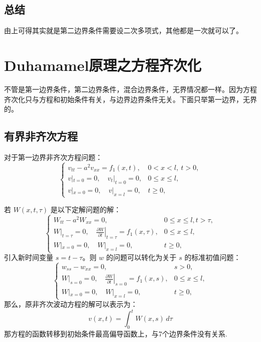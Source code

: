 \documentclass[a4paper, 12pt, oneside]{article} %
\numberwithin{subsection}{section}
\numberwithin{subsubsection}{subsection}
\theoremstyle{plain}
\theoremstyle{definition}
\theoremstyle{remark}
\begin{document}
		
		\subsection{总结}
		由上可得其实就是第二边界条件需要设二次多项式，其他都是一次就可以了。
		
		
		\section{Duhamamel原理之方程齐次化}
		不管是第一边界条件，第二边界条件，混合边界条件，无界情况都一样。因为方程齐次化只与方程和初始条件有关，与边界边界条件无关。下面只举第一边界，无界的。
		
		
		\subsection{有界非齐次方程}
		
		
		对于第一边界非齐次方程问题：
		\begin{equation}
			\begin{cases}
				v_{tt} - a^2 v_{xx} = f_1(x, t), & 0 < x < l, \ t > 0, \\
				v|_{t=0} = 0, \quad v_t|_{t=0} = 0, & 0 \leq x \leq l, \\
				v|_{x=0} = 0, \quad v|_{x=l} = 0, & t \geq 0,
			\end{cases}
		\end{equation}
		
		若 \( W(x, t, \tau) \) 是以下定解问题的解：
		\begin{equation}
			\begin{cases}
				W_{tt} - a^2 W_{xx} = 0, & 0 \leq x \leq l, t > \tau, \\
				W|_{t=\tau} = 0, \quad \left. \frac{\partial W}{\partial t} \right|_{t=\tau} = f_1(x, \tau), & 0 \leq x \leq l,\\
				W|_{x=0} = 0, \quad W|_{x=l} = 0, & t \geq 0,
			\end{cases}
		\end{equation}	
		引入新时间变量 $s = t-\tau$。则 $w$ 的问题可以转化为关于 $s$ 的标准初值问题：
		\begin{equation}
			\begin{cases}
				w_{ss} - w_{xx} = 0, & s > 0, \\
				W|_{s=0} = 0, \quad \left. \frac{\partial W}{\partial t} \right|_{s=0} = f_1(x, s), & 0 \leq x \leq l,\\
				W|_{x=0} = 0, \quad W|_{x=l} = 0, & t \geq 0,
			\end{cases}
		\end{equation}	
		那么，原非齐次波动方程的解可以表示为：
		\begin{equation}
			v(x, t) = \int_0^t W(x, s) \, d\tau
		\end{equation}
		那方程的函数转移到初始条件最高偏导函数上，与7个边界条件没有关系.
		
\end{document}
